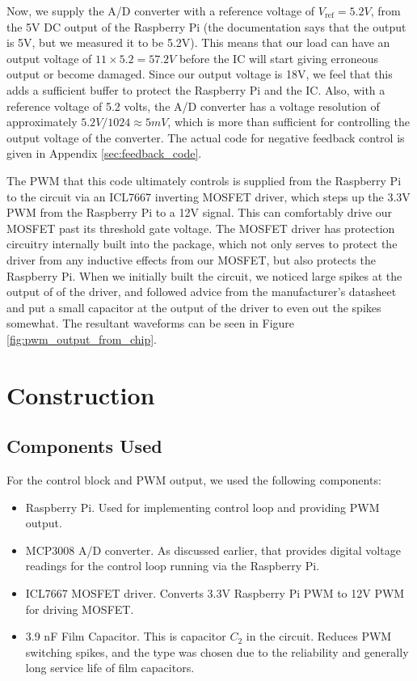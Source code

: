 \documentclass[a4paper, 12pt]{article}
\begin{document}
Now, we supply the A/D converter with a reference voltage of $V_{\text{ref}} =
5.2V$, from the 5V DC output of the Raspberry Pi (the documentation says that
the output is 5V, but we measured it to be 5.2V). This means that our load can
have an output voltage of $11 \times 5.2 = 57.2V$ before the IC will start
giving erroneous output or become damaged. Since our output voltage is 18V, we
feel that this adds a sufficient buffer to protect the Raspberry Pi and the IC.
Also, with a reference voltage of 5.2 volts, the A/D converter has a voltage
resolution of approximately $5.2V / 1024 \approx 5mV$, which is more than
sufficient for controlling the output voltage of the converter. The actual code
for negative feedback control is given in Appendix \ref{sec:feedback_code}.

The PWM that this code ultimately controls is supplied from the Raspberry Pi to
the circuit via an ICL7667 inverting MOSFET driver, which steps up the 3.3V PWM
from the Raspberry Pi to a 12V signal. This can comfortably drive our MOSFET
past its threshold gate voltage. The MOSFET driver has protection circuitry
internally built into the package, which not only serves to protect the driver
from any inductive effects from our MOSFET, but also protects the Raspberry Pi.
When we initially built the circuit, we noticed large spikes at the output of
of the driver, and followed advice from the manufacturer's datasheet and put a
small capacitor at the output of the driver to even out the spikes somewhat.
The resultant waveforms can be seen in Figure \ref{fig:pwm_output_from_chip}.




\section{Construction}

\subsection{Components Used}

For the control block and PWM output, we used the following components:
\begin{itemize}
  \item Raspberry Pi. Used for implementing control loop and providing PWM
    output.
  \item MCP3008 A/D converter. As discussed earlier, that provides digital
    voltage readings for the control loop running via the Raspberry Pi.
  \item ICL7667 MOSFET driver. Converts 3.3V Raspberry Pi PWM to 12V PWM for
    driving MOSFET.
  \item 3.9 nF Film Capacitor. This is capacitor $C_2$ in the circuit. Reduces
    PWM switching spikes, and the type was chosen due to the reliability and
    generally long service life of film capacitors.
\end{itemize}
\end{document}
